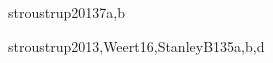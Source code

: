 \begin{syllabus}
\begin{unit}{\PLObjectOrientedProgramming}{}{stroustrup2013}{7}{a,b}
\begin{topics}
	\item \PLObjectOrientedProgrammingTopicObject
	\item \PLObjectOrientedProgrammingTopicDefinition
	\item \PLObjectOrientedProgrammingTopicSubclasses
	\item \PLObjectOrientedProgrammingTopicDynamic
	\item \PLObjectOrientedProgrammingTopicSubtyping
	\item \PLObjectOrientedProgrammingTopicObjectOriented
	\item \PLObjectOrientedProgrammingTopicUsing
\end{topics}

\begin{learningoutcomes}
	\item \PLObjectOrientedProgrammingLODesignAndClass [\Usage]
	\item \PLObjectOrientedProgrammingLOUseSubclassing [\Usage]
	\item \PLObjectOrientedProgrammingLOCorrectly [\Usage]
	\item \PLObjectOrientedProgrammingLOCompareAndThe [\Usage]
	\item \PLObjectOrientedProgrammingLOExplainTheObject [\Usage] 
	\item \PLObjectOrientedProgrammingLOUseObject [\Usage]
	\item \PLObjectOrientedProgrammingLODefineAndAnd [\Usage]
\end{learningoutcomes}
\end{unit}

\begin{unit}{\SDFAlgorithmsandDesign}{}{stroustrup2013,Weert16,StanleyB13}{5}{a,b,d}
\begin{topics}
	\item \SDFAlgorithmsandDesignTopicThe
	\item \SDFAlgorithmsandDesignTopicTheRole
	\item \SDFAlgorithmsandDesignTopicProblem
	\item \SDFAlgorithmsandDesignTopicFundamental
\end{topics}


\end{unit}
\end{syllabus}
